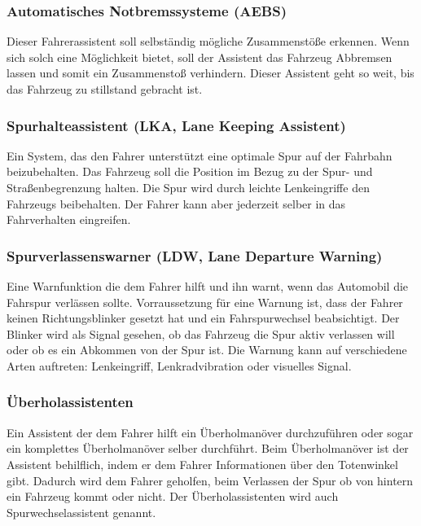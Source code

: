         \subsubsection{Automatisches Notbremssysteme (AEBS)}
        Dieser Fahrerassistent soll selbständig mögliche Zusammenstöße erkennen. Wenn sich solch
        eine Möglichkeit bietet, soll der Assistent das Fahrzeug Abbremsen lassen und somit ein
        Zusammenstoß verhindern. Dieser Assistent geht so weit, bis das Fahrzeug zu stillstand 
        gebracht ist.
        
        \subsubsection{Spurhalteassistent (LKA, Lane Keeping Assistent)}
        Ein System, das den Fahrer unterstützt eine optimale Spur auf der Fahrbahn beizubehalten.
        Das Fahrzeug soll die Position im Bezug zu der Spur- und Straßenbegrenzung halten. Die
        Spur wird durch leichte Lenkeingriffe den Fahrzeugs beibehalten. Der Fahrer kann aber
        jederzeit selber in das Fahrverhalten eingreifen.

        \subsubsection{Spurverlassenswarner (LDW, Lane Departure Warning)}
        Eine Warnfunktion die dem Fahrer hilft und ihn warnt, wenn das Automobil die Fahrspur
        verlässen sollte. Vorraussetzung für eine Warnung ist, dass der Fahrer keinen Richtungsblinker
        gesetzt hat und ein Fahrspurwechsel beabsichtigt. Der Blinker wird als Signal gesehen, ob das 
        Fahrzeug die Spur aktiv verlassen will oder ob es ein Abkommen von der Spur ist. Die 
        Warnung kann auf verschiedene Arten auftreten: Lenkeingriff, Lenkradvibration oder visuelles
        Signal.

        \subsubsection{Überholassistenten}
        Ein Assistent der dem Fahrer hilft ein Überholmanöver durchzuführen oder sogar ein
        komplettes Überholmanöver selber durchführt. Beim Überholmanöver ist der Assistent 
        behilflich, indem er dem Fahrer Informationen über den Totenwinkel gibt. Dadurch 
        wird dem Fahrer geholfen, beim Verlassen der Spur ob von hintern ein Fahrzeug kommt 
        oder nicht. Der Überholassistenten wird auch Spurwechselassistent genannt.
        
